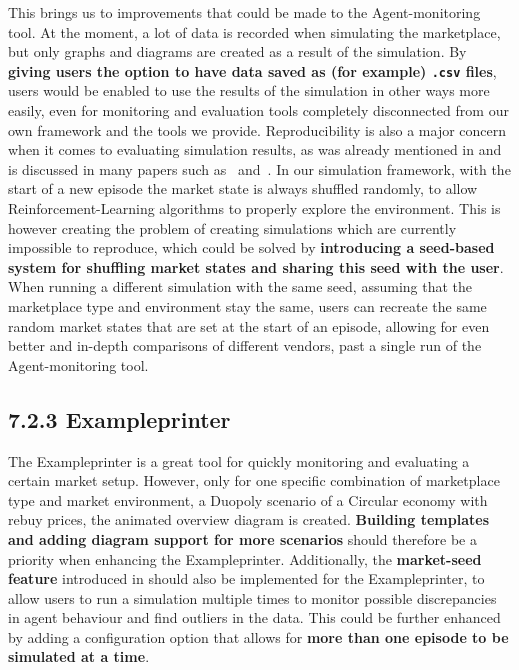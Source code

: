 This brings us to improvements that could be made to the Agent-monitoring tool. At the moment, a lot of data is recorded when simulating the marketplace, but only graphs and diagrams are created as a result of the simulation. By \textbf{giving users the option to have data saved as (for example) \texttt{.csv} files}, users would be enabled to use the results of the simulation in other ways more easily, even for monitoring and evaluation tools completely disconnected from our own framework and the tools we provide. Reproducibility is also a major concern when it comes to evaluating simulation results, as was already mentioned in  and is discussed in many papers such as~\cite{DRLThatMatters} and~\cite{ReproducibilityRL}. In our simulation framework, with the start of a new episode the market state is always shuffled randomly, to allow Reinforcement-Learning algorithms to properly explore the environment. This is however creating the problem of creating simulations which are currently impossible to reproduce, which could be solved by \textbf{introducing a seed-based system for shuffling market states and sharing this seed with the user}. When running a different simulation with the same seed, assuming that the marketplace type and environment stay the same, users can recreate the same random market states that are set at the start of an episode, allowing for even better and in-depth comparisons of different vendors, past a single run of the Agent-monitoring tool.

\subsection*{7.2.3 Exampleprinter}\label{subsec:FutureExampleprinter}

The Exampleprinter is a great tool for quickly monitoring and evaluating a certain market setup. However, only for one specific combination of marketplace type and market environment, a Duopoly scenario of a Circular economy with rebuy prices, the animated overview diagram is created. \textbf{Building templates and adding diagram support for more scenarios} should therefore be a priority when enhancing the Exampleprinter. Additionally, the \textbf{market-seed feature} introduced in  should also be implemented for the Exampleprinter, to allow users to run a simulation multiple times to monitor possible discrepancies in agent behaviour and find outliers in the data. This could be further enhanced by adding a configuration option that allows for \textbf{more than one episode to be simulated at a time}.

